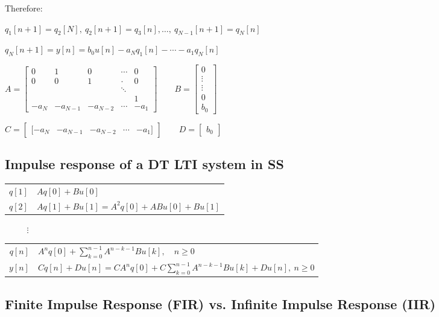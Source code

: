 \documentclass[8pt,a4paper]{scrartcl}
\begin{document}
\begin{multicols*}{3}
Therefore: 

$q_1[n+1]=q_2[N],\ q_2[n+1]=q_3[n],\ldots,\ q_{N-1}[n+1]=q_N[n]$

$q_N[n+1]=y[n]=b_0u[n]-a_Nq_1[n]-\cdots-a_1q_N[n]$

$A=\begin{bmatrix}0&1&0&\cdots&0\\0&0&1&\cdot&0\\&&&\ddots\\&&&&1\\-a_N&-a_{N-1}&-a_{N-2}&\cdots&-a_1\end{bmatrix}\qquad B=\begin{bmatrix}0\\\vdots\\\vdots\\0\\b_0\end{bmatrix}$

$C=\begin{bmatrix}[-a_N&-a_{N-1}&-a_{N-2}&\cdots&-a_1]\end{bmatrix}\qquad D=\begin{bmatrix}b_0\end{bmatrix}$

\subsection{Impulse response of a DT LTI system in SS}

\small
\begin{tabular}{r@{ = }l}
$q[1]$&$Aq[0]+Bu[0]$\\
$q[2]$&$Aq[1]+Bu[1]=A^2q[0]+ABu[0]+Bu[1]$
\end{tabular}

$\qquad\ \ \, \vdots$

\begin{tabular}{r@{ = }l}
$q[n]$&$A^nq[0]+\sum\limits_{k=0}^{n-1}A^{n-k-1}Bu[k],\quad n\geq 0$\\
\vspace{1ex}$y[n]$&$Cq[n]+Du[n]=CA^nq[0]+C\sum\limits_{k=0}^{n-1}A^{n-k-1}Bu[k]+Du[n],\ n\geq 0$
\end{tabular}
\normalsize


\subsection{Finite Impulse Response (FIR) vs. Infinite Impulse Response (IIR)}


\end{multicols*}
\end{document}
